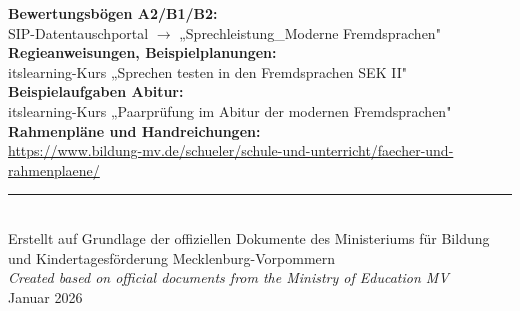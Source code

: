 \documentclass[11pt,a4paper]{article}
\begin{document}
\begin{infobox}
\textbf{Bewertungsbögen A2/B1/B2:}\\
SIP-Datentauschportal $\rightarrow$ „Sprechleistung\_Moderne Fremdsprachen"\\[0.3cm]
\textbf{Regieanweisungen, Beispielplanungen:}\\
itslearning-Kurs „Sprechen testen in den Fremdsprachen SEK II"\\[0.3cm]
\textbf{Beispielaufgaben Abitur:}\\
itslearning-Kurs „Paarprüfung im Abitur der modernen Fremdsprachen"\\[0.3cm]
\textbf{Rahmenpläne und Handreichungen:}\\
\url{https://www.bildung-mv.de/schueler/schule-und-unterricht/faecher-und-rahmenplaene/}
\end{infobox}

\vfill
\begin{center}
\rule{8cm}{0.5pt}\\[0.3cm]
{\small Erstellt auf Grundlage der offiziellen Dokumente des Ministeriums für Bildung und Kindertagesförderung Mecklenburg-Vorpommern}\\[0.2cm]
{\small\color{englishgray}\textit{Created based on official documents from the Ministry of Education MV}}\\[0.5cm]
{\footnotesize Januar 2026}
\end{center}
\end{document}
